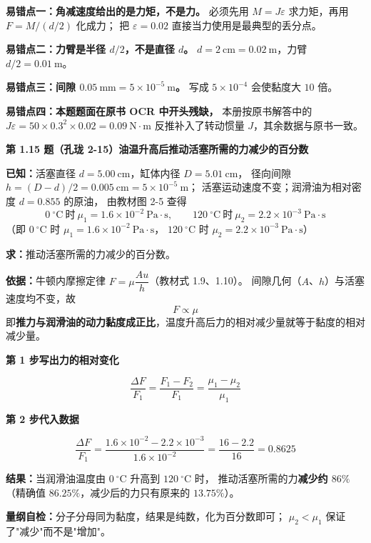 \begin{yicuo}
\textbf{易错点一：角减速度给出的是力矩，不是力。}
必须先用 $M=J\varepsilon$ 求力矩，再用 $F=M/(d/2)$ 化成力；
把 $\varepsilon=0.02$ 直接当力使用是最典型的丢分点。

\textbf{易错点二：力臂是半径 $d/2$，不是直径 $d$。}
$d=2\ \mathrm{cm}=0.02\ \mathrm{m}$，力臂 $d/2=0.01\ \mathrm{m}$。

\textbf{易错点三：间隙 $0.05\ \mathrm{mm}=5\times10^{-5}\ \mathrm{m}$。}
写成 $5\times10^{-4}$ 会使黏度大 $10$ 倍。

\textbf{易错点四：本题题面在原书 OCR 中开头残缺，}
本册按原书解答中的 $J\varepsilon=50\times0.3^{2}\times0.02=0.09\ \mathrm{N\cdot m}$
反推补入了转动惯量 $J$，其余数据与原书一致。
\end{yicuo}

\noindent\textbf{第 1.15 题（孔珑 2-15）\quad 油温升高后推动活塞所需的力减少的百分数}

\begin{jie}
\textbf{已知：}活塞直径 $d=5.00\ \mathrm{cm}$，缸体内径 $D=5.01\ \mathrm{cm}$，
径向间隙 $h=(D-d)/2=0.005\ \mathrm{cm}=5\times10^{-5}\ \mathrm{m}$；
活塞运动速度不变；润滑油为相对密度 $d=0.855$ 的原油，
由教材图 2-5 查得
\[ 0\ ^{\circ}\mathrm{C}\ \text{时}\ \mu_1=1.6\times10^{-2}\ \mathrm{Pa\cdot s},\qquad
   120\ ^{\circ}\mathrm{C}\ \text{时}\ \mu_2=2.2\times10^{-3}\ \mathrm{Pa\cdot s} \]
（即 $0\ ^{\circ}\mathrm{C}$ 时 $\mu_1=1.6\times10^{-2}\ \mathrm{Pa\cdot s}$，
$120\ ^{\circ}\mathrm{C}$ 时 $\mu_2=2.2\times10^{-3}\ \mathrm{Pa\cdot s}$）

\textbf{求：}推动活塞所需的力减少的百分数。

\textbf{依据：}牛顿内摩擦定律 $F=\mu\dfrac{A u}{h}$（教材式 1.9、1.10）。
间隙几何（$A$、$h$）与活塞速度均不变，故
\[ F\propto\mu \]
即\textbf{推力与润滑油的动力黏度成正比}，温度升高后力的相对减少量就等于黏度的相对减少量。

\textbf{第 1 步\quad 写出力的相对变化}

\[ \frac{\Delta F}{F_1}=\frac{F_1-F_2}{F_1}=\frac{\mu_1-\mu_2}{\mu_1} \]

\textbf{第 2 步\quad 代入数据}

\[ \frac{\Delta F}{F_1}=\frac{1.6\times10^{-2}-2.2\times10^{-3}}{1.6\times10^{-2}}
   =\frac{16-2.2}{16}=0.8625 \]

\textbf{结果：}当润滑油温度由 $0\ ^{\circ}\mathrm{C}$ 升高到 $120\ ^{\circ}\mathrm{C}$ 时，
推动活塞所需的力\textbf{减少约 $86\%$}
（精确值 $86.25\%$，减少后的力只有原来的 $13.75\%$）。

\textbf{量纲自检：}分子分母同为黏度，结果是纯数，化为百分数即可；
$\mu_2<\mu_1$ 保证了"减少"而不是"增加"。
\end{jie}

